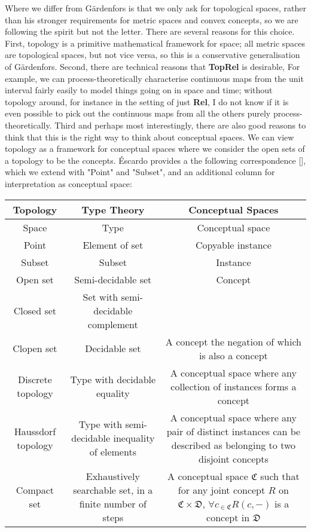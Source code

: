 \begin{fullwidth}
Where we differ from G\"{a}rdenfors is that we only ask for topological spaces, rather than his stronger requirements for metric spaces and convex concepts, so we are following the spirit but not the letter. There are several reasons for this choice. First, topology is a primitive mathematical framework for space; all metric spaces are topological spaces, but not vice versa, so this is a conservative generalisation of G\"{a}rdenfors. Second, there are technical reasons that \textbf{TopRel} is desirable, For example, we can process-theoretically characterise continuous maps from the unit interval fairly easily to model things going on in space and time; without topology around, for instance in the setting of just \textbf{Rel}, I do not know if it is even possible to pick out the continuous maps from all the others purely process-theoretically. Third and perhaps most interestingly, there are also good reasons to think that this is the right way to think about conceptual spaces. We can view topology as a framework for conceptual spaces where we consider the open sets of a topology to be the concepts. \'{E}scardo provides a the following correspondence [], which we extend with "Point" and "Subset", and an additional column for interpretation as conceptual space:

\begin{table}[h]
\begin{tabular}{|c|c|c|}
\hline
\textbf{Topology} & \textbf{Type Theory} & \textbf{Conceptual Spaces}  \\ \hline
Space & Type & Conceptual space \\  \hline
Point & Element of set & Copyable instance \\  \hline
Subset & Subset & Instance \\  \hline
Open set & Semi-decidable set & Concept \\ \hline
Closed set & Set with semi-decidable complement & \- \\ \hline
Clopen set & Decidable set & A concept the negation of which is also a concept \\ \hline
Discrete topology & Type with decidable equality & A conceptual space where any collection of instances forms a concept \\ \hline
Haussdorf topology & Type with semi-decidable inequality of elements & A conceptual space where any pair of distinct instances can be described as belonging to two disjoint concepts \\ \hline
Compact set & Exhaustively searchable set, in a finite number of steps & A conceptual space $\mathfrak{C}$ such that for any joint concept $R$ on $\mathfrak{C} \times \mathfrak{D}$, $\forall c_{ \in \mathfrak{C}}R(c,-)$ is a concept in $\mathfrak{D}$ \\ \hline
\end{tabular}
\end{table}


\end{fullwidth}
